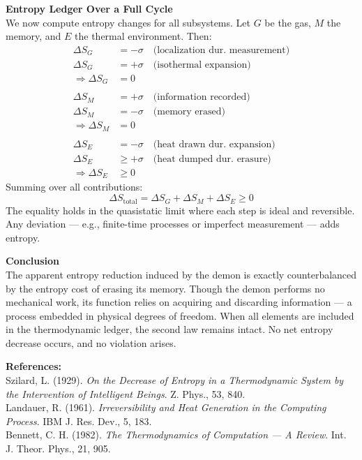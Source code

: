 \begin{technical}
\vspace{1.5em}
\noindent\textbf{Entropy Ledger Over a Full Cycle}\\[0.5em]
We now compute entropy changes for all subsystems. Let \( G \) be the gas, \( M \) the memory, and \( E \) the thermal environment. Then:
\begin{align*}
\Delta S_G &= -\sigma \quad \text{(localization dur. measurement)} \\
\Delta S_G &= +\sigma \quad \text{(isothermal expansion)} \\
\Rightarrow \Delta S_G &= 0 \\
\\[0.5em]
\Delta S_M &= +\sigma \quad \text{(information recorded)} \\
\Delta S_M &= -\sigma \quad \text{(memory erased)} \\
\Rightarrow \Delta S_M &= 0 \\
\\[0.5em]
\Delta S_E &= -\sigma \quad \text{(heat drawn dur. expansion)} \\
\Delta S_E &\geq +\sigma \quad \text{(heat dumped dur. erasure)} \\
\Rightarrow \Delta S_E &\geq 0
\end{align*}
Summing over all contributions:
\[
\Delta S_{\text{total}} = \Delta S_G + \Delta S_M + \Delta S_E \geq 0
\]
The equality holds in the quasistatic limit where each step is ideal and reversible. Any deviation — e.g., finite-time processes or imperfect measurement — adds entropy.

\vspace{0.5em}
\noindent\textbf{Conclusion}\\[0.5em]
The apparent entropy reduction induced by the demon is exactly counterbalanced by the entropy cost of erasing its memory. Though the demon performs no mechanical work, its function relies on acquiring and discarding information — a process embedded in physical degrees of freedom. When all elements are included in the thermodynamic ledger, the second law remains intact. No net entropy decrease occurs, and no violation arises.

\vspace{0.5em}
\noindent\textbf{References:}\\
Szilard, L. (1929). \textit{On the Decrease of Entropy in a Thermodynamic System by the Intervention of Intelligent Beings}. Z. Phys., 53, 840.\\
Landauer, R. (1961). \textit{Irreversibility and Heat Generation in the Computing Process}. IBM J. Res. Dev., 5, 183.\\
Bennett, C. H. (1982). \textit{The Thermodynamics of Computation — A Review}. Int. J. Theor. Phys., 21, 905.
\end{technical}
